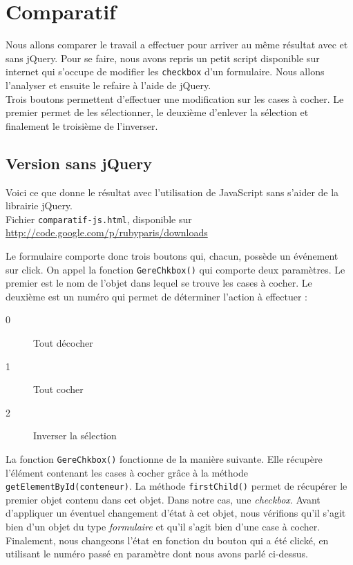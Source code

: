 \documentclass[10pt,a4paper,titlepage]{article}
\begin{document}
\newpage
\section{Comparatif}

Nous allons comparer le travail a effectuer pour arriver au même résultat avec et sans jQuery. Pour se faire, nous avons repris un petit script disponible sur internet qui s'occupe de modifier les \texttt{checkbox} d'un formulaire. Nous allons l'analyser et ensuite le refaire à l'aide de jQuery. \\

Trois boutons permettent d'effectuer une modification sur les cases à cocher. Le premier permet de les sélectionner, le deuxième d'enlever la sélection et finalement le troisième de l'inverser. \\

\subsection{Version sans jQuery}

Voici ce que donne le résultat avec l'utilisation de JavaScript sans s'aider de la librairie jQuery. \\

Fichier \texttt{comparatif-js.html}, disponible sur \url{http://code.google.com/p/rubyparis/downloads}



Le formulaire comporte donc trois boutons qui, chacun, possède un événement sur click. On appel la fonction \texttt{GereChkbox()} qui comporte deux paramètres. Le premier est le nom de l'objet dans lequel se trouve les cases à cocher. Le deuxième est un numéro qui permet de déterminer l'action à effectuer : 


\begin{description}
	\item[0] Tout décocher
	\item[1] Tout cocher
	\item[2] Inverser la sélection
\end{description}

La fonction \texttt{GereChkbox()} fonctionne de la manière suivante. Elle récupère l'élément contenant les cases à cocher grâce à la méthode \texttt{getElementById(conteneur)}. La méthode \texttt{firstChild()} permet de récupérer le premier objet contenu dans cet objet. Dans notre cas, une \emph{checkbox}. Avant d'appliquer un éventuel changement d'état à cet objet, nous vérifions qu'il s'agit bien d'un objet du type \emph{formulaire} et qu'il s'agit bien d'une case à cocher. Finalement, nous changeons l'état en fonction du bouton qui a été clické, en utilisant le numéro passé en paramètre dont nous avons parlé ci-dessus.
\end{document}
